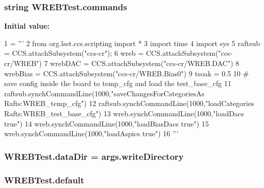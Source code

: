 \subsubsection[{\texorpdfstring{commands}{commands}}]{\setlength{\rightskip}{0pt plus 5cm}string W\+R\+E\+B\+Test.\+commands}\hypertarget{namespace_w_r_e_b_test_af903ad904d8e85aaf3f2df67c479867f}{}\label{namespace_w_r_e_b_test_af903ad904d8e85aaf3f2df67c479867f}
{\bfseries Initial value\+:}
\begin{DoxyCode}
1 = \textcolor{stringliteral}{'''}
2 \textcolor{stringliteral}{    from org.lsst.ccs.scripting import *}
3 \textcolor{stringliteral}{    import time}
4 \textcolor{stringliteral}{    import sys}
5 \textcolor{stringliteral}{    raftsub  = CCS.attachSubsystem("ccs-cr");}
6 \textcolor{stringliteral}{    wreb     = CCS.attachSubsystem("ccs-cr/WREB")}
7 \textcolor{stringliteral}{    wrebDAC  = CCS.attachSubsystem("ccs-cr/WREB.DAC")}
8 \textcolor{stringliteral}{    wrebBias = CCS.attachSubsystem("ccs-cr/WREB.Bias0")}
9 \textcolor{stringliteral}{    tsoak = 0.5}
10 \textcolor{stringliteral}{    # save config inside the board to temp\_cfg and load the test\_base\_cfg}
11 \textcolor{stringliteral}{    raftsub.synchCommandLine(1000,"saveChangesForCategoriesAs Rafts:WREB\_temp\_cfg")}
12 \textcolor{stringliteral}{    raftsub.synchCommandLine(1000,"loadCategories Rafts:WREB\_test\_base\_cfg")}
13 \textcolor{stringliteral}{    wreb.synchCommandLine(1000,"loadDacs true")}
14 \textcolor{stringliteral}{    wreb.synchCommandLine(1000,"loadBiasDacs true")}
15 \textcolor{stringliteral}{    wreb.synchCommandLine(1000,"loadAspics true")}
16 \textcolor{stringliteral}{    '''}
\end{DoxyCode}
\subsubsection[{\texorpdfstring{data\+Dir}{dataDir}}]{\setlength{\rightskip}{0pt plus 5cm}W\+R\+E\+B\+Test.\+data\+Dir = args.\+write\+Directory}\hypertarget{namespace_w_r_e_b_test_a1f2debd7e26cbbabbe9d62214581cfe3}{}\label{namespace_w_r_e_b_test_a1f2debd7e26cbbabbe9d62214581cfe3}
\subsubsection[{\texorpdfstring{default}{default}}]{\setlength{\rightskip}{0pt plus 5cm}W\+R\+E\+B\+Test.\+default}\hypertarget{namespace_w_r_e_b_test_aaea9bb9d2571f00dcf628f0e3e4838d0}{}\label{namespace_w_r_e_b_test_aaea9bb9d2571f00dcf628f0e3e4838d0}
